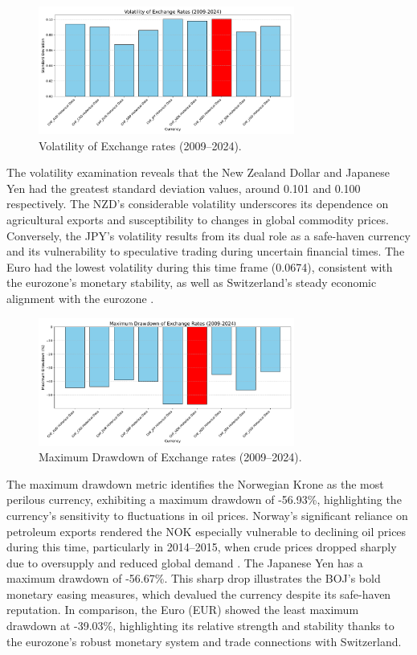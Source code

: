 \documentclass[11pt,a4paper,english,oneside]{book}
\begin{document}
\begin{figure}[h!]
    \centering
    \includegraphics[width=0.75\textwidth]{images/volatility_2009_2024.pdf}
    \caption{Volatility of Exchange rates (2009--2024).}
    \label{fig:volatility_2009_2024}
\end{figure}

The volatility examination reveals that the New Zealand Dollar and Japanese Yen had the greatest standard deviation values, around 0.101 and 0.100 respectively. The NZD's considerable volatility underscores its dependence on agricultural exports and susceptibility to changes in global commodity prices. Conversely, the JPY's volatility results from its dual role as a safe-haven currency and its vulnerability to speculative trading during uncertain financial times. The Euro had the lowest volatility during this time frame (0.0674), consistent with the eurozone's monetary stability, as well as Switzerland's steady economic alignment with the eurozone \parencite{claessens2010cross}.

\begin{figure}[h!]
    \centering
    \includegraphics[width=0.75\textwidth]{images/maximum_drawdown_2009_2024.pdf}
    \caption{Maximum Drawdown of Exchange rates (2009--2024).}
    \label{fig:maximum_drawdown_2009_2024}
\end{figure}

The maximum drawdown metric identifies the Norwegian Krone as the most perilous currency, exhibiting a maximum drawdown of -56.93\%, highlighting the currency’s sensitivity to fluctuations in oil prices. Norway's significant reliance on petroleum exports rendered the NOK especially vulnerable to declining oil prices during this time, particularly in 2014–2015, when crude prices dropped sharply due to oversupply and reduced global demand \parencite{bergholt2016business}. The Japanese Yen has a maximum drawdown of -56.67\%. This sharp drop illustrates the BOJ's bold monetary easing measures, which devalued the currency despite its safe-haven reputation. In comparison, the Euro (EUR) showed the least maximum drawdown at -39.03\%, highlighting its relative strength and stability thanks to the eurozone's robust monetary system and trade connections with Switzerland.
\end{document}
